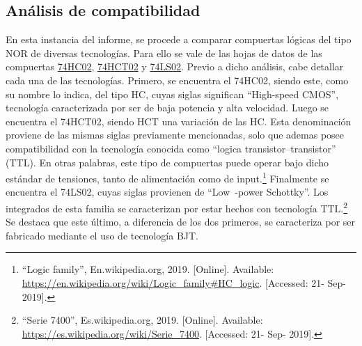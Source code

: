 \subsection{Análisis de compatibilidad}

En esta instancia del informe, se procede a comparar compuertas lógicas del tipo NOR de diversas tecnologías. Para ello se vale de las hojas de datos de las compuertas \href{http://www.ti.com/lit/ds/symlink/sn74hc02.pdf}{74HC02}, \href{http://www.ti.com/lit/ds/symlink/sn74hct02.pdf}{74HCT02} y \href{http://www.ti.com/lit/ds/symlink/sn74ls02.pdf}{74LS02}. Previo a dicho análisis, cabe detallar cada una de las tecnologías. Primero, se encuentra el 74HC02, siendo este, como su nombre lo indica, del tipo HC, cuyas siglas significan ``High-speed CMOS'', tecnología caracterizada por ser de baja potencia y alta velocidad. Luego se encuentra el 74HCT02, siendo HCT una variación de las HC. Esta denominación proviene de las mismas siglas previamente mencionadas, solo que ademas posee compatibilidad con la tecnología conocida como ``logica transistor–transistor'' (TTL). En otras palabras, este tipo de compuertas puede operar bajo dicho estándar de tensiones, tanto de alimentación como de input.\footnote{``Logic family'', En.wikipedia.org, 2019. [Online]. Available: \url{https://en.wikipedia.org/wiki/Logic\_family\#HC\_logic}. [Accessed: 21- Sep- 2019].} Finalmente se encuentra el 74LS02, cuyas siglas provienen de ``Low~-power Schottky''. Los integrados de esta familia se caracterizan por estar hechos con tecnología TTL.\footnote{``Serie 7400'', Es.wikipedia.org, 2019. [Online]. Available: \url{https://es.wikipedia.org/wiki/Serie\_7400}. [Accessed: 21- Sep- 2019].} Se destaca que este último, a diferencia de los dos primeros, se caracteriza por ser fabricado mediante el uso de tecnología BJT.

